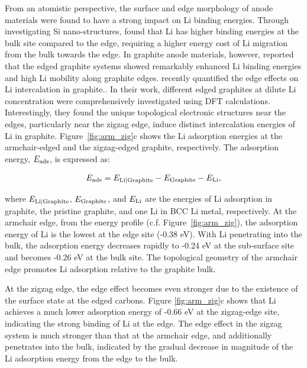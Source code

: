 \documentclass[../main.tex]{subfiles}
\begin{document}
From an atomistic perspective, the surface and edge morphology of anode materials were found to have a strong impact on Li binding energies.\cite{uthaisar2010edge,leggesse2016lithium} Through investigating Si nano-structures, \citeauthor{chan2010controlling} found that Li has higher binding energies at the bulk site compared to the edge, requiring a higher energy cost of Li migration from the bulk towards the edge.\cite{chan2010controlling} In graphite anode materials, however, \citeauthor{leggesse2016lithium} reported that the edged graphite systems showed remarkably enhanced Li binding energies and high Li mobility along graphite edges.\cite{leggesse2016lithium} \citeauthor{peng2020lithium} recently quantified the edge effects on Li intercalation in graphite.\cite{peng2020lithium}. In their work, different edged graphites at dilute Li concentration were comprehensively investigated using DFT calculations. Interestingly, they found the unique topological electronic structures near the edges, particularly near the zigzag edge, induce distinct intercalation energies of Li in graphite. Figure~\ref{fig:arm_zig}c shows the Li adsorption energies at the armchair-edged and the zigzag-edged graphite, respectively. The adsorption energy, $E_{\rm{ads}}$, is expressed as:

\begin{equation}
    E_{\rm{ads}} = E_{\rm{Li|Graphite}}-E_{\rm{Graphite}}-E_{\rm{Li}},
    \label{eq:adsorption_energy}
\end{equation}

where $E_{\rm{Li|Graphite}}$, $E_{\rm{Graphite}}$, and $E_{\rm{Li}}$ are the energies of Li adsorption in graphite, the pristine graphite, and one Li in BCC Li metal, respectively. At the armchair edge, from the energy profile (c.f. Figure~\ref{fig:arm_zig}), the adsorption energy of Li is the lowest at the edge site (-0.38 eV). With Li penetrating into the bulk, the adsorption energy decreases rapidly to -0.24 eV at the sub-surface site and becomes -0.26 eV at the bulk site. The topological geometry of the armchair edge promotes Li adsorption relative to the graphite bulk.

At the zigzag edge, the edge effect becomes even stronger due to the existence of the surface state at the edged carbons.\cite{fujita1996peculiar,lee2005magnetic} Figure \ref{fig:arm_zig}c shows that Li achieves a much lower adsorption energy of -0.66 eV at the zigzag-edge site, indicating the strong binding of Li at the edge. The edge effect in the zigzag system is much stronger than that at the armchair edge, and additionally penetrates into the bulk, indicated by the gradual decrease in magnitude of the Li adsorption energy from the edge to the bulk. 
\end{document}
